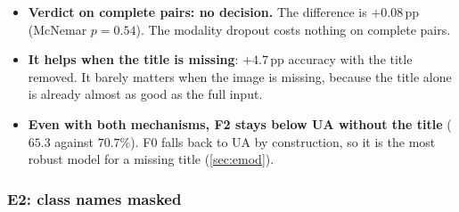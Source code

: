 \begin{table}[H]
  \centering\small
  \caption{E4. The natural missing-text set has $121$ items; ``[MISSING]'' feeds the learned missing token instead of the uninformative title.}
  \label{tab:e4}
\end{table}

\begin{itemize}
  \item \textbf{Verdict on complete pairs: no decision.} The difference is $+0.08$\,pp (McNemar $p=0.54$). The
        modality dropout costs nothing on complete pairs.
  \item \textbf{It helps when the title is missing}: $+4.7$\,pp accuracy with the title removed. It barely matters
        when the image is missing, because the title alone is already almost as good as the full input.
  \item \textbf{Even with both mechanisms, F2 stays below UA without the title} ($65.3$ against $70.7\%$). F0 falls
        back to UA by construction, so it is the most robust model for a missing title (\cref{sec:emod}).
\end{itemize}

\subsubsection{E2: class names masked}
\label{sec:e2}

